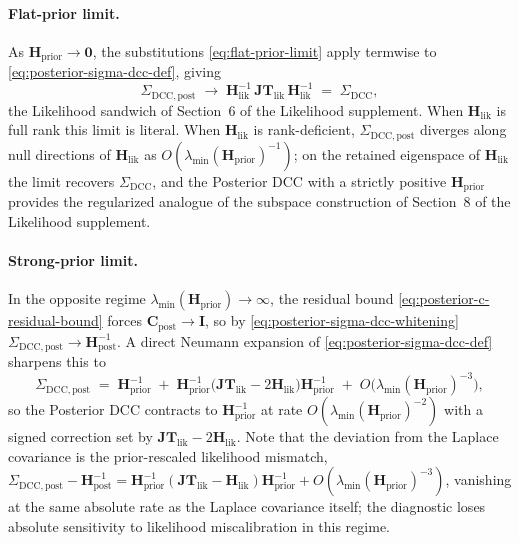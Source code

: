 \documentclass[11pt]{article}
\begin{document}
\paragraph{Flat-prior limit.}
As $\mathbf H_{\mathrm{prior}} \to \mathbf 0$, the substitutions \eqref{eq:flat-prior-limit} apply termwise to \eqref{eq:posterior-sigma-dcc-def}, giving
\begin{equation}
\Sigma_{\mathrm{DCC},\mathrm{post}}
\;\longrightarrow\;
\mathbf H_{\mathrm{lik}}^{-1}\,
\mathbf{JT}_{\mathrm{lik}}\,
\mathbf H_{\mathrm{lik}}^{-1}
\;=\;
\Sigma_{\mathrm{DCC}},
\label{eq:posterior-sigma-dcc-flat-limit}
\end{equation}
the Likelihood sandwich of Section~6 of the Likelihood supplement. When $\mathbf H_{\mathrm{lik}}$ is full rank this limit is literal. When $\mathbf H_{\mathrm{lik}}$ is rank-deficient, $\Sigma_{\mathrm{DCC},\mathrm{post}}$ diverges along null directions of $\mathbf H_{\mathrm{lik}}$ as $O(\lambda_{\min}(\mathbf H_{\mathrm{prior}})^{-1})$; on the retained eigenspace of $\mathbf H_{\mathrm{lik}}$ the limit recovers $\Sigma_{\mathrm{DCC}}$, and the Posterior DCC with a strictly positive $\mathbf H_{\mathrm{prior}}$ provides the regularized analogue of the subspace construction of Section~8 of the Likelihood supplement.

\paragraph{Strong-prior limit.}
In the opposite regime $\lambda_{\min}(\mathbf H_{\mathrm{prior}}) \to \infty$, the residual bound \eqref{eq:posterior-c-residual-bound} forces $\mathbf C_{\mathrm{post}} \to \mathbf I$, so by \eqref{eq:posterior-sigma-dcc-whitening} $\Sigma_{\mathrm{DCC},\mathrm{post}} \to \mathbf H_{\mathrm{post}}^{-1}$. A direct Neumann expansion of \eqref{eq:posterior-sigma-dcc-def} sharpens this to
\begin{equation}
\Sigma_{\mathrm{DCC},\mathrm{post}}
\;=\;
\mathbf H_{\mathrm{prior}}^{-1}
\;+\;
\mathbf H_{\mathrm{prior}}^{-1}\bigl(\mathbf{JT}_{\mathrm{lik}} - 2\mathbf H_{\mathrm{lik}}\bigr)\mathbf H_{\mathrm{prior}}^{-1}
\;+\;
O\!\bigl(\lambda_{\min}(\mathbf H_{\mathrm{prior}})^{-3}\bigr),
\label{eq:posterior-sigma-dcc-strong-limit}
\end{equation}
so the Posterior DCC contracts to $\mathbf H_{\mathrm{prior}}^{-1}$ at rate $O(\lambda_{\min}(\mathbf H_{\mathrm{prior}})^{-2})$ with a signed correction set by $\mathbf{JT}_{\mathrm{lik}} - 2\mathbf H_{\mathrm{lik}}$. Note that the deviation from the Laplace covariance is the prior-rescaled likelihood mismatch, $\Sigma_{\mathrm{DCC},\mathrm{post}} - \mathbf H_{\mathrm{post}}^{-1} = \mathbf H_{\mathrm{prior}}^{-1}(\mathbf{JT}_{\mathrm{lik}} - \mathbf H_{\mathrm{lik}})\mathbf H_{\mathrm{prior}}^{-1} + O(\lambda_{\min}(\mathbf H_{\mathrm{prior}})^{-3})$, vanishing at the same absolute rate as the Laplace covariance itself; the diagnostic loses absolute sensitivity to likelihood miscalibration in this regime.
\end{document}
